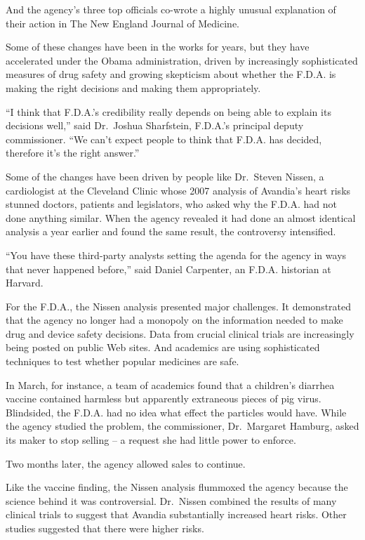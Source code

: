 ﻿\documentclass[12pt]{article}
\begin{document}
And the agency's three top officials co-wrote a highly unusual explanation of their action in The
New England Journal of Medicine.

Some of these changes have been in the works for years, but they have accelerated under the Obama
administration, driven by increasingly sophisticated measures of drug safety and growing skepticism
about whether the F.D.A. is making the right decisions and making them appropriately.

``I think that F.D.A.'s credibility really depends on being able to explain its decisions well,''
said Dr.~Joshua Sharfstein, F.D.A.'s principal deputy commissioner. ``We can't expect people to
think that F.D.A. has decided, therefore it's the right answer.''

Some of the changes have been driven by people like Dr.~Steven Nissen, a cardiologist at the
Cleveland Clinic whose 2007 analysis of Avandia's heart risks stunned doctors, patients and
legislators, who asked why the F.D.A. had not done anything similar. When the agency revealed it had
done an almost identical analysis a year earlier and found the same result, the controversy
intensified.

``You have these third-party analysts setting the agenda for the agency in ways that never happened
before,'' said Daniel Carpenter, an F.D.A. historian at Harvard.

For the F.D.A., the Nissen analysis presented major challenges. It demonstrated that the agency no
longer had a monopoly on the information needed to make drug and device safety decisions. Data from
crucial clinical trials are increasingly being posted on public Web sites. And academics are using
sophisticated techniques to test whether popular medicines are safe.

In March, for instance, a team of academics found that a children's diarrhea vaccine contained
harmless but apparently extraneous pieces of pig virus. Blindsided, the F.D.A. had no idea what
effect the particles would have. While the agency studied the problem, the commissioner,
Dr.~Margaret Hamburg, asked its maker to stop selling -- a request she had little power to enforce.

Two months later, the agency allowed sales to continue.

Like the vaccine finding, the Nissen analysis flummoxed the agency because the science behind it was
controversial. Dr.~Nissen combined the results of many clinical trials to suggest that Avandia
substantially increased heart risks. Other studies suggested that there were higher risks.
\end{document}
